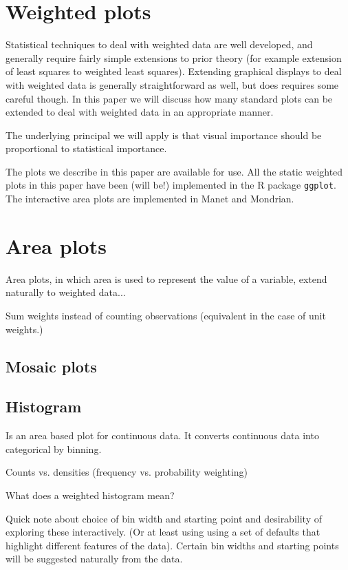 \documentclass[oneside,letterpaper]{scrartcl}
\begin{document}
\section{Weighted plots}\label{sec:weighted_plots}

Statistical techniques to deal with weighted data are well developed, and generally require fairly simple extensions to prior theory (for example extension of least squares to weighted least squares).  Extending graphical displays to deal with weighted data is generally straightforward as well, but does requires some careful though.  In this paper we will discuss how many standard plots can be extended to deal with weighted data in an appropriate manner.  

The underlying principal we will apply is that visual importance should be proportional to statistical importance. 

The plots we describe in this paper are available for use.  All the static weighted plots in this paper have been (will be!) implemented in the R package {\tt ggplot}.  The interactive area plots are implemented in Manet and Mondrian.

\section{Area plots}\label{sec:area_plots}

Area plots, in which area is used to represent the value of a variable, extend naturally to weighted data...

Sum weights instead of counting observations (equivalent in the case of unit weights.)

\subsection{Mosaic plots}\label{sub:mosaic_plots}

\subsection{Histogram}\label{sub:histogram}

Is an area based plot for continuous data.  It converts continuous data into categorical by binning.  
 
Counts vs. densities (frequency vs. probability weighting)

What does a weighted histogram mean? 

Quick note about choice of bin width and starting point and desirability of exploring these interactively.  (Or at least using using a set of defaults that highlight different features of the data).  Certain bin widths and starting points will be suggested naturally from the data.
\end{document}
